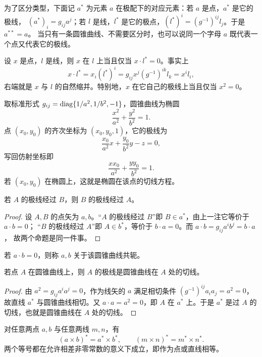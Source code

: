 为了区分类型，下面记 $a^*$ 为元素 $a$ 在极配下的对应元素：若 $a$ 是点，$a^*$ 是它的极线，
$(a^*)_i=g_{ij}a^j$；若 $l$ 是线，$l^*$ 是它的极点，$(l^*)^i=(g^{-1})^{ij}l_j$。于是 $a^{**}=a$。
当只有一条圆锥曲线、不需要区分时，也可以说同一个字母 $a$ 既代表一个点又代表它的极线。

\begin{remark}
设 $x$ 是点，$l$ 是线，则 $x$ 在 $l$ 上当且仅当 $x\cdot l^*=0$。事实上
\[
x\cdot l^*=x_i(l^*)^i=g_{ij}x^j(g^{-1})^{ik}l_k=x^il_i,
\]
右端就是 $x$ 与 $l$ 的自然缩并。特别地，$x$ 在它自己的极线上当且仅当 $x^2=0$。
\end{remark}

\begin{example}[极线的解析式]
取标准形式 $g_{ij}=\operatorname{diag}\{1/a^2,1/b^2,-1\}$，圆锥曲线为椭圆
\[
\frac{x^2}{a^2}+\frac{y^2}{b^2}=1 .
\]
点 $(x_0,y_0)$ 的齐次坐标为 $(x_0,y_0,1)$，它的极线为
\[
\frac{x_0}{a^2}x+\frac{y_0}{b^2}y-z=0,
\]
写回仿射坐标即
\[
\frac{xx_0}{a^2}+\frac{yy_0}{b^2}=1 .
\]
若 $(x_0,y_0)$ 在椭圆上，这就是椭圆在该点的切线方程。
\end{example}

\begin{example}[极线互过]
若 $A$ 的极线经过 $B$，则 $B$ 的极线经过 $A$。
\end{example}

\begin{proof}
设 $A,B$ 的点矢为 $a,b$。“$A$ 的极线经过 $B$”即 $B\in a^*$，由上一注它等价于 $a\cdot b=0$；
“$B$ 的极线经过 $A$”即 $A\in b^*$，等价于 $b\cdot a=0$。而 $a\cdot b=g_{ij}a^ib^j=b\cdot a$，
故两个命题是同一件事。
\end{proof}

\begin{definition}[共轭]
若 $a\cdot b=0$，则称 $a,b$ 关于该圆锥曲线共轭。
\end{definition}

\begin{example}[曲线上点的极线是切线]
若点 $A$ 在圆锥曲线上，则 $A$ 的极线是圆锥曲线在 $A$ 处的切线。
\end{example}

\begin{proof}
由 $a^2=g_{ij}a^ia^j=0$，作为线矢的 $a$ 满足相切条件
$(g^{-1})^{ij}a_ia_j=a^2=0$，故直线 $a^*$ 与圆锥曲线相切。又 $a\cdot a=a^2=0$，即 $A$ 在
$a^*$ 上。于是 $a^*$ 是过 $A$ 的切线，也就是圆锥曲线在 $A$ 处的切线。
\end{proof}

\begin{proposition}[极配与叉乘]
对任意两点 $a,b$ 与任意两线 $m,n$，有
\[
(a\times b)^*=a^*\times b^*,\qquad (m\times n)^*=m^*\times n^* .
\]
两个等号都在允许相差非零常数的意义下成立，即作为点或直线相等。
\end{proposition}

